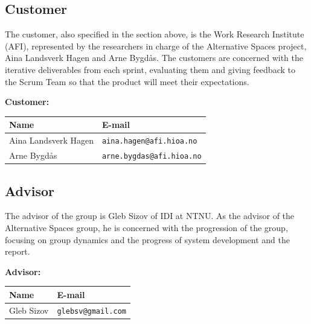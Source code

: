 \subsection{Customer}
\label{subsec:IntroStakeCustomer}
The customer, also specified in the section above, is the Work Research Institute (AFI), represented by the researchers in charge of the Alternative Spaces project, Aina Landsverk Hagen and Arne Bygdås. The customers are concerned with the iterative deliverables from each sprint, evaluating them and giving feedback to the Scrum Team so that the product will meet their expectations.

\begin{minipage}{\linewidth}
\centering
\setlength{\tabcolsep}{22pt}
\textbf{Customer:} \\
\smallskip
{}
\begin{tabular}{|l l|}
    \hline
    \cellcolor{gray!25} \textbf{Name} & \cellcolor{gray!25} \textbf{E-mail} \\
    \hline
    Aina Landsverk Hagen & \texttt{aina.hagen@afi.hioa.no} \\
    Arne Bygd\aa s & \texttt{arne.bygdas@afi.hioa.no} \\
    \hline
\end{tabular}
\end{minipage}

\subsection{Advisor}
\label{subsec:IntroStakeAdvisor}

The advisor of the group is Gleb Sizov of IDI at NTNU. As the advisor of the Alternative Spaces group, he is concerned with the progression of the group, focusing on group dynamics and the progress of system development and the report. 

\begin{minipage}{\linewidth}
\centering
\setlength{\tabcolsep}{22pt}
\textbf{Advisor:} \\
\smallskip
{}
\begin{tabular}{|l l|}
    \hline
    \cellcolor{gray!25} \textbf{Name} & \cellcolor{gray!25} \textbf{E-mail} \\
    \hline
    Gleb Sizov & \texttt{glebsv@gmail.com} \\
    \hline
\end{tabular}
\end{minipage}

